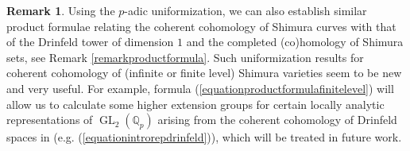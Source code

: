 \documentclass{article}
\theoremstyle{definition}
\newtheorem{remark}[theorem]{Remark}
\def\bbQ{\mathbb{Q}}
\DeclareMathOperator{\GL}{GL}
\begin{document}
\begin{remark}
    Using the $p$-adic uniformization, we can also establish similar product formulae relating the coherent cohomology of Shimura curves with that of the Drinfeld tower of dimension $1$ and the completed (co)homology of Shimura sets, see Remark \ref{remarkproductformula}. Such uniformization results for coherent cohomology of (infinite or finite level) Shimura varieties seem to be new and very useful. For example, formula (\ref{equationproductformulafinitelevel}) will allow us to calculate some higher extension groups for certain locally analytic representations of $\GL_2(\bbQ_p)$ arising from the coherent cohomology of Drinfeld spaces in \cite{DLB17} (e.g. (\ref{equationintrorepdrinfeld})), which will be treated in future work.
\end{remark}
\end{document}
